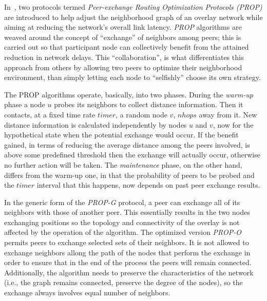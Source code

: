 In~\cite{QCYCZ2007}, two protocols termed 
\emph{Peer-exchange Routing Optimization Protocols (PROP)} 
are introduced to help adjust the neighborhood graph of an overlay network
while aiming at reducing the network's overall link latency.
\emph{PROP} algorithms are weaved around the concept of
``exchange'' of neighbors among peers; 
this is carried out so that participant node can collectively 
benefit from the attained reduction in network delays. 
This ``collaboration'', is what differentiates this approach 
from others by allowing two peers to optimize
their neighborhood environment, than simply letting each node to ``selfishly''
choose its own strategy. 

The PROP algorithms operate, basically, into two phases. During the \emph{warm-up}
phase a node $u$ probes its neighbors to collect distance information. Then it
contacts, at a fixed time rate $timer$, a random node $v$, $nhops$ away from it. New distance
information is calculated independently by nodes $u$ and $v$, now for the
hypothetical state when the potential exchange would occur. If the benefit
gained, in terms of reducing the average distance among the peers involved, is
above some predefined threshold then the exchange will actually occur,
otherwise no further action will be taken. The \emph{maintenance} phase, on the
other hand, differs from the warm-up one, in that the probability
of peers to be probed and the $timer$ interval that this happens, now depends on
past peer exchange results.

In the generic form of the \emph{PROP-G} protocol, a peer can exchange all of
its neighbors with those of another peer. This essentially results in the two
nodes exchanging positions so the topology and connectivity of the overlay is
not affected by the operation of the algorithm. The optimized version
\emph{PROP-O} permits peers to exchange selected sets of their neighbors. It is
not allowed to exchange neighbors allong the path of the nodes that perform the
exchange in order to ensure that in the end of the process the peers will remain
connected. Additionally, the algorithm needs to preserve the characteristics of
the network (i.e., the graph remains connected, preserve the degree of the
nodes), so the exchange always involves equal number of neighbors.

